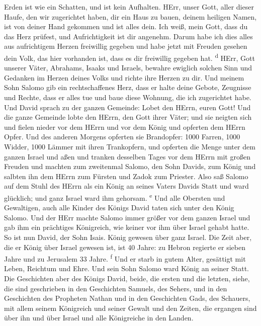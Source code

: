 Erden ist wie ein Schatten, und ist kein Aufhalten. 
HErr, unser Gott, aller dieser Haufe, den wir zugerichtet haben, dir ein
Haus zu bauen, deinem heiligen Namen, ist von deiner Hand gekommen und
ist alles dein.  Ich weiß, mein Gott, dass du das Herz
prüfest, und Aufrichtigkeit ist dir angenehm. Darum habe ich dies alles
aus aufrichtigem Herzen freiwillig gegeben und habe jetzt mit Freuden
gesehen dein Volk, das hier vorhanden ist, dass es dir freiwillig
gegeben hat. \textsuperscript{d}  HErr, Gott unserer
Väter, Abrahams, Isaaks und Israels, bewahre ewiglich solchen Sinn und
Gedanken im Herzen deines Volks und richte ihre Herzen zu dir.
 Und meinem Sohn Salomo gib ein rechtschaffenes Herz,
dass er halte deine Gebote, Zeugnisse und Rechte, dass er alles tue und
baue diese Wohnung, die ich zugerichtet habe.  Und David
sprach zu der ganzen Gemeinde: Lobet den HErrn, euren Gott! Und die
ganze Gemeinde lobte den HErrn, den Gott ihrer Väter; und sie neigten
sich und fielen nieder vor dem HErrn und vor dem König 
und opferten dem HErrn Opfer. Und des anderen Morgens opferten sie
Brandopfer: 1000 Farren, 1000 Widder, 1000 Lämmer mit ihren Trankopfern,
und opferten die Menge unter dem ganzen Israel  und aßen
und tranken desselben Tages vor dem HErrn mit großen Freuden und machten
zum zweitenmal Salomo, den Sohn Davids, zum König und salbten ihn dem
HErrn zum Fürsten und Zadok zum Priester.  Also saß
Salomo auf dem Stuhl des HErrn als ein König an seines Vaters Davids
Statt und ward glücklich; und ganz Israel ward ihm gehorsam.
\textsuperscript{e}  Und alle Obersten und Gewaltigen,
auch alle Kinder des Königs David taten sich unter den König Salomo.
 Und der HErr machte Salomo immer größer vor dem ganzen
Israel und gab ihm ein prächtiges Königreich, wie keiner vor ihm über
Israel gehabt hatte.  So ist nun David, der Sohn Isais.
König gewesen über ganz Israel.  Die Zeit aber, die er
König über Israel gewesen ist, ist 40 Jahre: zu Hebron regierte er
sieben Jahre und zu Jerusalem 33 Jahre. \textsuperscript{f}
 Und er starb in gutem Alter, gesättigt mit Leben,
Reichtum und Ehre. Und sein Sohn Salomo ward König an seiner Statt.
 Die Geschichten aber des Königs David, beide, die ersten
und die letzten, siehe, die sind geschrieben in den Geschichten Samuels,
des Sehers, und in den Geschichten des Propheten Nathan und in den
Geschichten Gads, des Schauers,  mit allem seinem
Königreich und seiner Gewalt und den Zeiten, die ergangen sind über ihn
und über Israel und alle Königreiche in den Landen.
